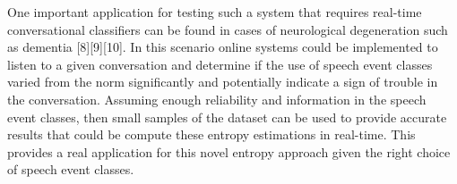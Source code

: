 One important application for testing such a system that requires real-time conversational classifiers can be found in cases of neurological degeneration such as dementia [8][9][10]. In this scenario online systems could be implemented to listen to a given conversation and determine if the use of speech event classes varied from the norm significantly and potentially indicate a sign of trouble in the conversation. Assuming enough reliability and information in the speech event classes, then small samples of the dataset can be used to provide accurate results that could be compute these entropy estimations in real-time. This provides a real application for this novel entropy approach given the right choice of speech event classes. 


